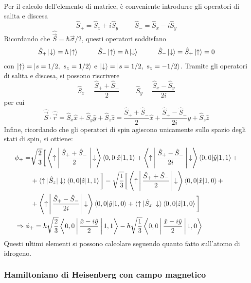 \documentclass[11pt, a4paper]{scrartcl} %
\numberwithin{equation}{subsection}
\theoremstyle{style2}
\theoremstyle{style1}
\begin{document}
Per il calcolo dell'elemento di matrice, \`e conveniente introdurre gli operatori di salita e discesa 
\[
\hat{S}_+ = \hat{S}_x + i \hat{S}_y \hspace{1cm} \hat{S}_- = \hat{S}_x - i \hat{S}_y
\] 
Ricordando che $\hat{\vec{S}} = \hbar  \vec{\sigma }/2$, questi operatori soddisfano
\[
\hat{S}_+ \ket{\downarrow} = \hbar \ket{\uparrow} \hspace{1cm}\hat{S}_- \ket{\uparrow} = \hbar \ket{\downarrow} \hspace{1cm} \hat{S}_- \ket{\downarrow} = \hat{S}_+ \ket{\uparrow} = 0
\] 
con $\ket{\uparrow} = \ket{s=1 / 2, \ s_z = 1 / 2} $ e $\ket{\downarrow} = \ket{s=1 / 2, \ s_z = -1 / 2} $.
Tramite gli operatori di salita e discesa, si possono riscrivere 
\[
\hat{S}_x = \frac{\hat{S}_+ + \hat{S}_-}{2} \hspace{1cm}\hat{S}_y = \frac{\hat{S}_x - \hat{S}_y}{2i}
\] 
per cui 
\[
\hat{\vec{S}}\cdot \hat{\vec{r}}= \hat{S}_x \hat{x} + \hat{S}_y \hat{y} + \hat{S}_z \hat{z}= \frac{\hat{S}_+ + \hat{S}_-}{2}\hat{x}+ \frac{\hat{S}_+ - \hat{S}_-}{2i} \hat{y} + \hat{S}_z \hat{z}
\] 
Infine, ricordando che gli operatori di spin agiscono unicamente sullo spazio degli stati di spin, si ottiene:
\[
\begin{split}
&\begin{split}
	\phi _+ =&  \sqrt{\frac{2}{3}}\bigg[ \Braket{\uparrow|\frac{\hat{S}_+ + \hat{S}_-}{2}|\downarrow} \braket{0,0|\hat{x}|1,1} + \Braket{\uparrow|\frac{\hat{S}_+ - \hat{S}_-}{2i}|\downarrow} \braket{0,0|\hat{y}|1,1}+ \\
		 &+ \braket{\uparrow|\hat{S}_z|\downarrow} \braket{0,0|\hat{z}|1,1}   \bigg] - \sqrt{\frac{1}{3}} \bigg[\Braket{\uparrow|\frac{\hat{S}_+ + \hat{S}_-}{2}|\downarrow} \braket{0,0|\hat{x}|1,0} + \\
		 &+ \Braket{\uparrow|\frac{\hat{S}_+ - \hat{S}_-}{2i}|\downarrow}\braket{0,0|\hat{y}|1,0} +\braket{\uparrow|\hat{S}_z|\downarrow} \braket{0,0|\hat{z}|1,0}  \bigg]
\end{split} \\
& \Rightarrow \phi _+ = \hbar \sqrt{\frac{2}{3}} \Braket{0,0|\frac{\hat{x}- i \hat{y}}{2}|1,1} - \hbar \sqrt{\frac{1}{3}} \Braket{0,0|\frac{\hat{x}- i\hat{y}}{2}|1,0} 
\end{split}
\] 
Questi ultimi elementi si possono calcolare seguendo quanto fatto sull'atomo di idrogeno.

\subsubsection{Hamiltoniano di Heisenberg con campo magnetico}
\end{document}
